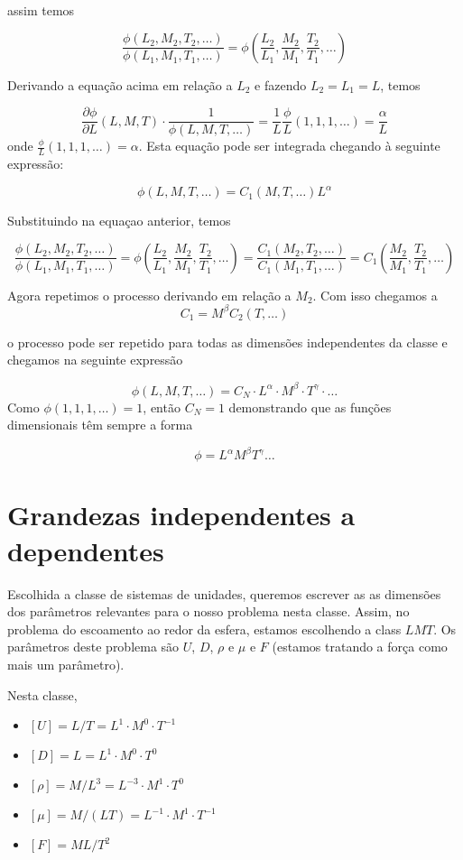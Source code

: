 assim temos


\[
\frac{ \phi\left(L_2, M_2, T_2, \ldots\right) }{ \phi\left(L_1, M_1, T_1, \ldots\right) } = \phi\left(\frac{L_2}{L_1}, \frac{M_2}{M_1}, \frac{T_2}{T_1}, \ldots \right)
\]

Derivando a equação acima em relação a $L_2$ e fazendo $L_2 = L_1 = L$, temos

\[
\frac{\partial\phi}{\partial L}(L,M,T) \cdot \frac{1}{\phi(L,M,T,\ldots)} = \frac{1}{L}\frac{\phi}{L}(1,1,1,\ldots) = \frac{\alpha}{L}
\]
onde $\frac{\phi}{L}(1,1,1,\ldots) = \alpha$. Esta equação pode ser integrada chegando à seguinte expressão:

\[
\phi(L,M,T,\ldots) = C_1(M,T,\ldots) L^\alpha
\]

Substituindo na equaçao anterior, temos

\[
\frac{ \phi\left(L_2, M_2, T_2, \ldots\right) }{ \phi\left(L_1, M_1, T_1, \ldots\right) } = \phi\left(\frac{L_2}{L_1}, \frac{M_2}{M_1}, \frac{T_2}{T_1}, \ldots \right) =
\frac{ C_1\left(M_2, T_2, \ldots\right) }{ C_1\left(M_1, T_1, \ldots\right) } = C_1\left(\frac{M_2}{M_1}, \frac{T_2}{T_1}, \ldots \right)
\]

Agora repetimos o processo derivando em relação a $M_2$. Com isso chegamos a
\[
C_1 = M^\beta C_2(T, \ldots)
\]

o processo pode ser repetido para todas as dimensões independentes da classe e chegamos na seguinte expressão

\[
\phi(L,M,T,\ldots) = C_N\cdot L^\alpha\cdot M^\beta \cdot T^\gamma\cdot\ldots
\]
Como $\phi(1,1,1,\ldots) = 1$, então $C_N = 1$ demonstrando que as funções dimensionais têm sempre a forma

\[
\phi = L^\alpha M^\beta T^\gamma \ldots
\]



\section{Grandezas independentes a dependentes}

Escolhida a classe de sistemas de unidades, queremos escrever as as dimensões dos parâmetros relevantes para o nosso problema nesta classe. Assim, no problema do escoamento ao redor da esfera, estamos escolhendo a class $LMT$. Os parâmetros deste problema são $U$, $D$, $\rho$ e $\mu$ e $F$  (estamos tratando a força como mais um parâmetro).

Nesta classe,

\begin{itemize}
\item $[U] = L/T = L^1\cdot M^0 \cdot T^{-1}$
\item $[D] = L = L^1 \cdot M^0\cdot T^0$
\item $[\rho] = M/L^3 = L^{-3}\cdot M^1\cdot T^0$
\item $[\mu] = M/(LT) = L^{-1}\cdot M^1\cdot T^{-1}$
\item $[F] = ML/T^2$
\end{itemize}

